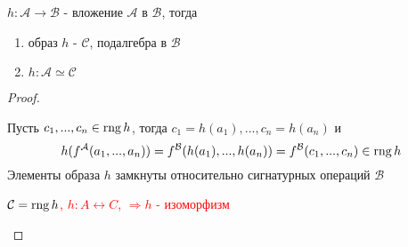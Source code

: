 \documentclass[../main/document.tex]{subfiles}
\begin{document}
\begin{thm}
$h:\mathcal{A}\rightarrow \mathcal{B}$ - вложение $\mathcal{A}$ в $\mathcal{B}$, тогда
\begin{enumerate}
\item образ $h$ - $\mathcal{C}$, подалгебра в $\mathcal{B}$
\item $h:\mathcal{A}\simeq\mathcal{C}$
\end{enumerate}
\begin{proof}
\begin{enumerate}
\item Пусть $c_1,...,c_n\in \operatorname{rng} h$, тогда $c_1=h(a_1),...,c_n=h(a_n)$ и
$$h(f^{\mathcal{A}}(a_1,...,a_n))=f^{\mathcal{B}}(h(a_1),...,h(a_n))=f^{\mathcal{B}}(c_1,...,c_n)\in \operatorname{rng} h$$
Элементы образа $h$ замкнуты относительно сигнатурных операций $\mathcal{B}$
\textcolor{red}{\item $\mathcal{C}=\operatorname{rng} h$,
$h:A\leftrightarrow C$,
$\Rightarrow h$ - изоморфизм}
\end{enumerate}

\end{proof}
\end{thm}
\end{document}
